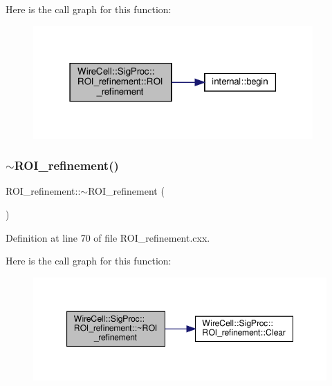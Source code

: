 Here is the call graph for this function\+:
\nopagebreak
\begin{figure}[H]
\begin{center}
\leavevmode
\includegraphics[width=303pt]{class_wire_cell_1_1_sig_proc_1_1_r_o_i__refinement_ad7b2030a624f7cc8753c028696792bb9_cgraph}
\end{center}
\end{figure}
\mbox{\label{class_wire_cell_1_1_sig_proc_1_1_r_o_i__refinement_a818642a2a38842b4201ce2f84269b9c7}} 
\subsubsection{\texorpdfstring{$\sim$\+R\+O\+I\+\_\+refinement()}{~ROI\_refinement()}}
{\footnotesize\ttfamily R\+O\+I\+\_\+refinement\+::$\sim$\+R\+O\+I\+\_\+refinement (\begin{DoxyParamCaption}{ }\end{DoxyParamCaption})}



Definition at line 70 of file R\+O\+I\+\_\+refinement.\+cxx.

Here is the call graph for this function\+:
\nopagebreak
\begin{figure}[H]
\begin{center}
\leavevmode
\includegraphics[width=347pt]{class_wire_cell_1_1_sig_proc_1_1_r_o_i__refinement_a818642a2a38842b4201ce2f84269b9c7_cgraph}
\end{center}
\end{figure}


